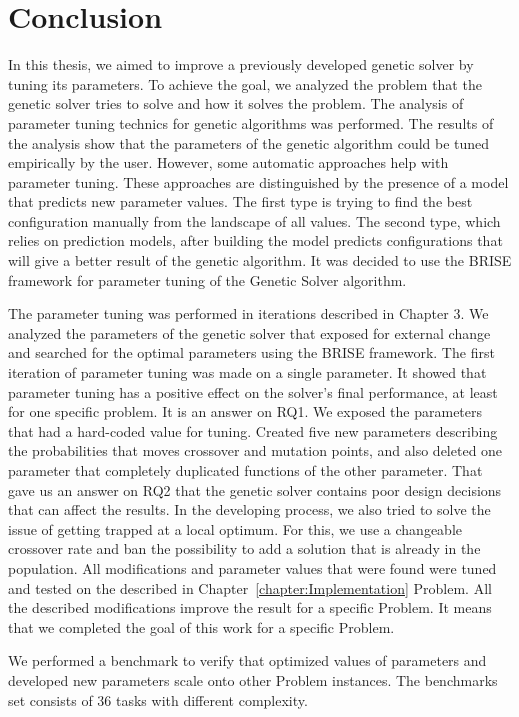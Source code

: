 \chapter{Conclusion}
In this thesis, we aimed to improve a previously developed genetic solver by tuning its parameters. To achieve the goal, we analyzed the problem that the genetic solver tries to solve and how it solves the problem. The analysis of parameter tuning technics for genetic algorithms was performed. The results of the analysis show that the parameters of the genetic algorithm could be tuned empirically by the user. However, some automatic approaches help with parameter tuning. These approaches are distinguished by the presence of a model that predicts new parameter values. The first type is trying to find the best configuration manually from the landscape of all values. The second type, which relies on prediction models, after building the model predicts configurations that will give a better result of the genetic algorithm. It was decided to use the BRISE framework for parameter tuning of the Genetic Solver algorithm.

The parameter tuning was performed in iterations described in Chapter 3. We analyzed the parameters of the genetic solver that exposed for external change and searched for the optimal parameters using the BRISE framework.
The first iteration of parameter tuning was made on a single parameter. It showed that parameter tuning has a positive effect on the solver's final performance, at least for one specific problem. It is an answer on RQ1.
We exposed the parameters that had a hard-coded value for tuning. Created five new parameters describing the probabilities that moves crossover and mutation points, and also deleted one parameter that completely duplicated functions of the other parameter. That gave us an answer on RQ2 that the genetic solver contains poor design decisions that can affect the results.
In the developing process, we also tried to solve the issue of getting trapped at a local optimum.  For this, we use a changeable crossover rate and ban the possibility to add a solution that is already in the population.
All modifications and parameter values that were found were tuned and tested on the described in Chapter~\ref{chapter:Implementation} Problem.
All the described modifications improve the result for a specific Problem. It means that we completed the goal of this work for a specific Problem.

We performed a benchmark to verify that optimized values of parameters and developed new parameters scale onto other Problem instances. The benchmarks set consists of 36 tasks with different complexity. 

